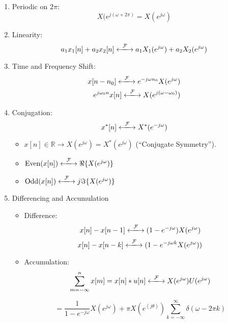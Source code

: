 \documentclass[a4paper,12pt]{report}
\def\fft{\xlongleftrightarrow{\mathcal{F}}}
\begin{document}
\begin{enumerate}
\item Periodic on $2\pi$: \begin{equation}
X(e^{j(\omega+2\pi)} = X(e^{j\omega})
\end{equation}

\item Linearity: 
\begin{equation}
a_1 x_1[n] + a_2 x_2[n] \fft a_1 X_1(e^{j\omega}) + a_2 X_2(e^{j\omega})
\end{equation}

\item Time and Frequency Shift: 
\begin{align}
x[n-n_0] \fft e^{-j\omega n_0} X(e^{j\omega}) \\ 
e^{j\omega_0 n} x[n] \fft X(e^{j(\omega-\omega_0)})
\end{align}

\item Conjugation: 
\begin{equation}
x^*[n] \fft X^*(e^{-j\omega})
\end{equation}
\begin{itemize}
\item $x[n] \in \mathbb{R} \to X(e^{j\omega}) = X^*(e^{j\omega})$ (``Conjugate Symmetry'').
\item $\text{Even}(x[n]) \fft \Re\{X(e^{j\omega})\}$
\item $\text{Odd}(x[n]) \fft j\Im\{X(e^{j\omega})\}$
\end{itemize}


\item Differencing and Accumulation
\begin{itemize}
\item Difference: 
\begin{equation}
x[n] - x[n-1] \fft (1-e^{-j\omega})X(e^{j\omega})
\end{equation}
\begin{equation}
x[n] - x[n-k] \fft (1-e^{-j\omega k}X(e^{j\omega}))
\end{equation}

\item Accumulation: 
\begin{equation}
\sum_{m=-\infty}^{n} x[m] = x[n] * u[n] \fft X(e^{j\omega})U(e^{j\omega}) 
\end{equation}

\begin{equation}
= \frac{1}{1-e^{-j\omega}} X(e^{j\omega}) + \pi X(e^{(j\theta)}) \sum_{k=-\infty}^{\infty} \delta(\omega - 2\pi k)
\end{equation}
\end{itemize}


\end{enumerate}
\end{document}
